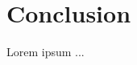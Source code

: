\documentclass[shortpaper]{revdetua}
\begin{document}


\section{Conclusion}

Lorem ipsum ...


 

\end{document}
